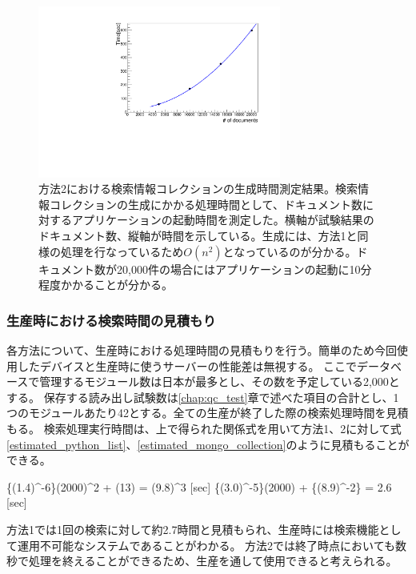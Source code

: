 \begin{figure}[bpt]
  \begin{center}
  \includegraphics[width=8cm,angle=270]{./creating_cache_time.pdf}
  \caption[方法2における検索情報コレクションの生成時間測定結果]{方法2における検索情報コレクションの生成時間測定結果。検索情報コレクションの生成にかかる処理時間として、ドキュメント数に対するアプリケーションの起動時間を測定した。横軸が試験結果のドキュメント数、縦軸が時間を示している。生成には、方法1と同様の処理を行なっているため$O(n^2)$となっているのが分かる。ドキュメント数が20,000件の場合にはアプリケーションの起動に10分程度かかることが分かる。}
  \label{creating_cache_time}
  \end{center}
\end{figure}

\subsubsection{生産時における検索時間の見積もり}
各方法について、生産時における処理時間の見積もりを行う。簡単のため今回使用したデバイスと生産時に使うサーバーの性能差は無視する。
ここでデータベースで管理するモジュール数は日本が最多とし、その数を予定している2,000とする。
保存する読み出し試験数は\ref{chap:qc_test}章で述べた項目の合計とし、1つのモジュールあたり42とする。全ての生産が終了した際の検索処理時間を見積もる。
検索処理実行時間は、上で得られた関係式を用いて方法1、2に対して式\ref{estimated_python_list}、\ref{estimated_mongo_collection}のように見積もることができる。

\bbb
\{(1.4)^{-6}\}\times(2000)^2 + (13) = (9.8)^{3} [\rm{sec}]
\label{estimated_python_list}
\eee
\bbb
\{(3.0)^{-5}\}\times(2000) + \{(8.9)^{-2}\} = 2.6 [\rm{sec}]
\label{estimated_mongo_collection}
\eee

方法1では1回の検索に対して約2.7時間と見積もられ、生産時には検索機能として運用不可能なシステムであることがわかる。
方法2では終了時点においても数秒で処理を終えることができるため、生産を通して使用できると考えられる。
 

